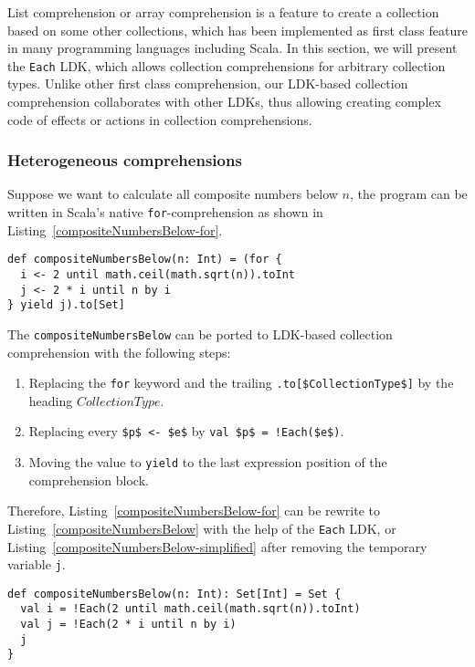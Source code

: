 List comprehension or array comprehension is a feature to create a collection based on some other collections, which has been implemented as first class feature in many programming languages including Scala. In this section, we will present the \lstinline{Each} LDK, which allows collection comprehensions for arbitrary collection types. Unlike other first class comprehension, our LDK-based collection comprehension collaborates with other LDKs, thus allowing creating complex code of effects or actions in collection comprehensions.

\subsubsection{Heterogeneous comprehensions}\label{Heterogeneous comprehensions}

Suppose we want to calculate all composite numbers below $n$, the program can be written in Scala's native \lstinline{for}-comprehension as shown in Listing~\ref{compositeNumbersBelow-for}.

\begin{lstlisting}[caption={Calculating all composite numbers below $n$ with \lstinline{for}-comprehension},label={compositeNumbersBelow-for}]
def compositeNumbersBelow(n: Int) = (for {
  i <- 2 until math.ceil(math.sqrt(n)).toInt
  j <- 2 * i until n by i
} yield j).to[Set]
\end{lstlisting}

The \lstinline{compositeNumbersBelow} can be ported to LDK-based collection comprehension with the following steps:

\begin{enumerate}
  \item Replacing the \lstinline{for} keyword and the trailing \lstinline[mathescape=true]{.to[$CollectionType$]} by the heading $CollectionType$.
  \item Replacing every \lstinline[mathescape=true]{$p$ <- $e$} by \lstinline[mathescape=true]{val $p$ = !Each($e$)}.
  \item Moving the value to \lstinline{yield} to the last expression position of the comprehension block.
\end{enumerate}

Therefore, Listing~\ref{compositeNumbersBelow-for} can be rewrite to Listing~\ref{compositeNumbersBelow} with the help of the \lstinline{Each} LDK, or Listing~\ref{compositeNumbersBelow-simplified} after removing the temporary variable \lstinline{j}.

\begin{lstlisting}[caption={Calculating all composite numbers below $n$ with \lstinline{Each} LDK},label={compositeNumbersBelow}]
def compositeNumbersBelow(n: Int): Set[Int] = Set {
  val i = !Each(2 until math.ceil(math.sqrt(n)).toInt)
  val j = !Each(2 * i until n by i)
  j
}
\end{lstlisting}


